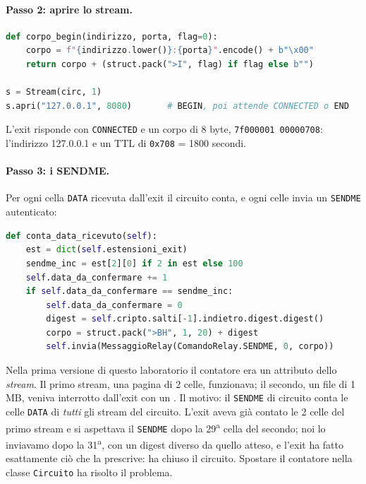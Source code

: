 \paragraph{Passo 2: aprire lo stream.}
\begin{lstlisting}[language=Python]
def corpo_begin(indirizzo, porta, flag=0):
    corpo = f"{indirizzo.lower()}:{porta}".encode() + b"\x00"
    return corpo + (struct.pack(">I", flag) if flag else b"")

s = Stream(circ, 1)
s.apri("127.0.0.1", 8080)       # BEGIN, poi attende CONNECTED o END
\end{lstlisting}
L'exit risponde con \texttt{CONNECTED} e un corpo di 8 byte, \texttt{7f000001 00000708}: l'indirizzo 127.0.0.1 e un TTL di \texttt{0x708} = 1800 secondi.

\paragraph{Passo 3: i SENDME.} Per ogni cella \texttt{DATA} ricevuta dall'exit il circuito conta, e ogni  celle invia un \texttt{SENDME} autenticato:
\begin{lstlisting}[language=Python]
def conta_data_ricevuto(self):
    est = dict(self.estensioni_exit)
    sendme_inc = est[2][0] if 2 in est else 100
    self.data_da_confermare += 1
    if self.data_da_confermare == sendme_inc:
        self.data_da_confermare = 0
        digest = self.cripto.salti[-1].indietro.digest.digest()
        corpo = struct.pack(">BH", 1, 20) + digest
        self.invia(MessaggioRelay(ComandoRelay.SENDME, 0, corpo))
\end{lstlisting}

\begin{attenzione}
Nella prima versione di questo laboratorio il contatore era un attributo dello \emph{stream}. Il primo stream, una pagina di 2 celle, funzionava; il secondo, un file di 1\,MB, veniva interrotto dall'exit con un . Il motivo: il \texttt{SENDME} di circuito conta le celle \texttt{DATA} di \emph{tutti} gli stream del circuito. L'exit aveva già contato le 2 celle del primo stream e si aspettava il \texttt{SENDME} dopo la 29\textsuperscript{a} cella del secondo; noi lo inviavamo dopo la 31\textsuperscript{a}, con un digest diverso da quello atteso, e l'exit ha fatto esattamente ciò che la  prescrive: ha chiuso il circuito. Spostare il contatore nella classe \texttt{Circuito} ha risolto il problema.
\end{attenzione}

